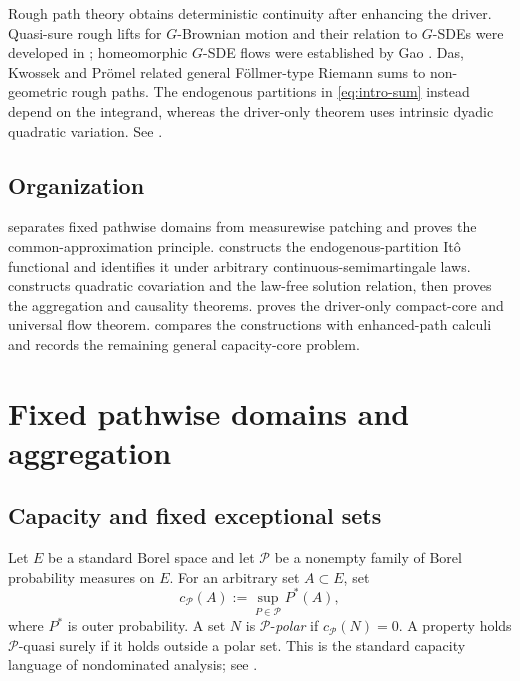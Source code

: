 \documentclass[11pt,reqno]{amsart}
\theoremstyle{plain}
\theoremstyle{definition}
\newcommand{\cP}{\mathcal P}
\begin{document}
Rough path theory \cite{Lyons98,FrizHairer20} obtains deterministic
continuity after enhancing the driver.  Quasi-sure rough lifts for
\(G\)-Brownian motion and their relation to \(G\)-SDEs were developed in
\cite{GQY14,PengZhang17}; homeomorphic \(G\)-SDE flows were established by
Gao \cite{Gao09}.  Das, Kwossek and Pr\"omel \cite{DasKwossekPromel25}
related general F\"ollmer-type Riemann sums to non-geometric rough
paths.  The endogenous partitions in \eqref{eq:intro-sum} instead depend on
the integrand, whereas the driver-only theorem uses intrinsic dyadic
quadratic variation.  See .

\subsection{Organization}

 separates fixed pathwise domains from measurewise
patching and proves the common-approximation principle.
 constructs the endogenous-partition It\^o functional and
identifies it under arbitrary continuous-semimartingale laws.
 constructs quadratic covariation and the law-free
solution relation, then proves the aggregation and causality theorems.
 proves the driver-only compact-core and universal flow
theorem.   compares the constructions with enhanced-path
calculi and records the remaining general capacity-core problem.

\section{Fixed pathwise domains and aggregation}
\label{sec:fixedsets}

\subsection{Capacity and fixed exceptional sets}

Let \(E\) be a standard Borel space and let \(\cP\) be a nonempty family of
Borel probability measures on \(E\).  For an arbitrary set \(A\subset E\), set
\begin{equation}\label{eq:capacity}
  c_{\cP}(A):=\sup_{P\in\cP}P^*(A),
\end{equation}
where \(P^*\) is outer probability.  A set \(N\) is
\(\cP\)-\emph{polar} if \(c_{\cP}(N)=0\).  A property holds
\(\cP\)-quasi surely if it holds outside a polar set.  This is the standard
capacity language of nondominated analysis; see
\cite{DenisHuPeng11,STZ11}.
\end{document}

